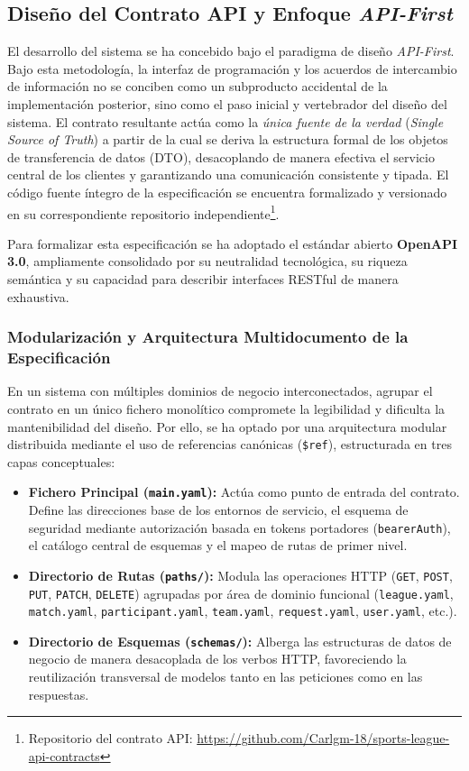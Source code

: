 \subsection{Diseño del Contrato API y Enfoque \textit{API-First}}
\label{subsec:api_contract_design}

El desarrollo del sistema se ha concebido bajo el paradigma de diseño \textit{API-First}. Bajo esta metodología, la interfaz de programación y los acuerdos de intercambio de información no se conciben como un subproducto accidental de la implementación posterior, sino como el paso inicial y vertebrador del diseño del sistema. El contrato resultante actúa como la \textit{única fuente de la verdad} (\textit{Single Source of Truth}) a partir de la cual se deriva la estructura formal de los objetos de transferencia de datos (\ac{DTO}), desacoplando de manera efectiva el servicio central de los clientes y garantizando una comunicación consistente y tipada. El código fuente íntegro de la especificación se encuentra formalizado y versionado en su correspondiente repositorio independiente\footnote{Repositorio del contrato API: \url{https://github.com/Carlgm-18/sports-league-api-contracts}}.

Para formalizar esta especificación se ha adoptado el estándar abierto \textbf{OpenAPI 3.0}, ampliamente consolidado por su neutralidad tecnológica, su riqueza semántica y su capacidad para describir interfaces RESTful de manera exhaustiva.

\subsubsection{Modularización y Arquitectura Multidocumento de la Especificación}
En un sistema con múltiples dominios de negocio interconectados, agrupar el contrato en un único fichero monolítico compromete la legibilidad y dificulta la mantenibilidad del diseño. Por ello, se ha optado por una arquitectura modular distribuida mediante el uso de referencias canónicas (\texttt{\$ref}), estructurada en tres capas conceptuales:

\begin{itemize}
    \item \textbf{Fichero Principal (\texttt{main.yaml}):} Actúa como punto de entrada del contrato. Define las direcciones base de los entornos de servicio, el esquema de seguridad mediante autorización basada en tokens portadores (\texttt{bearerAuth}), el catálogo central de esquemas y el mapeo de rutas de primer nivel.
    \item \textbf{Directorio de Rutas (\texttt{paths/}):} Modula las operaciones HTTP (\texttt{GET}, \texttt{POST}, \texttt{PUT}, \texttt{PATCH}, \texttt{DELETE}) agrupadas por área de dominio funcional (\texttt{league.yaml}, \texttt{match.yaml}, \texttt{participant.yaml}, \texttt{team.yaml}, \texttt{request.yaml}, \texttt{user.yaml}, etc.).
    \item \textbf{Directorio de Esquemas (\texttt{schemas/}):} Alberga las estructuras de datos de negocio de manera desacoplada de los verbos HTTP, favoreciendo la reutilización transversal de modelos tanto en las peticiones como en las respuestas.
\end{itemize}

